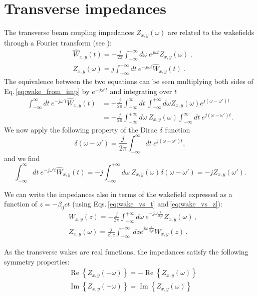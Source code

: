 \section{Transverse impedances}
The transverse beam coupling impedances $Z_{x,y}(\omega)$ are related to the wakefields through a Fourier transform (see \cite[Eq. 1.216]{Mounet:Thesis}):
\begin{align}
    &\widehat{W}_{x,y}(t) = -\frac{j}{2\pi}\int_{-\infty}^{+\infty} d\omega \ e^{j\omega t} Z_{x,y}(\omega)~,\label{eq:wake_from_imp}\\
    &Z_{x,y}(\omega) = j\int_{-\infty}^{+\infty} dt \ e^{-j\omega t} \widehat{W}_{x,y}(t)~.\label{eq:imp_from_wake}
\end{align}
The equivalence between the two equations can be seen multiplying both sides of Eq.\,\ref{eq:wake_from_imp} by $e^{-j\omega' t}$ and integrating over $t$
\begin{align}
    \int_{-\infty}^{\infty}dt \ e^{-j\omega' t}\widehat{W}_{x,y}(t) &= -\frac{j}{2\pi}\int_{-\infty}^{\infty}dt \ \int_{-\infty}^{+\infty} d\omega Z_{x,y}(\omega)e^{j(\omega-\omega') t}\\
    &= -\frac{j}{2\pi} \int_{-\infty}^{+\infty} d\omega \ Z_{x,y}(\omega) \int_{-\infty}^{\infty}dt \ e^{j(\omega-\omega') t}.
\end{align}
We now apply the following property of the Dirac $\delta$ function
\begin{equation}
    \delta(\omega-\omega') =  \frac{j}{2\pi} \int_{-\infty}^{\infty} dt \ e^{j(\omega-\omega') t},
\end{equation}
and we find
\begin{equation}
    \int_{-\infty}^{\infty}dt \ e^{-j\omega' t}\widehat{W}_{x,y}(t) = -j \int_{-\infty}^{+\infty} d\omega \ Z_{x,y}(\omega) \delta(\omega-\omega') = -j Z_{x, y}(\omega').
\end{equation}

We can write the impedances also in terms of the wakefield expressed as a function of $z= -\beta_0 c t$ (using Eqs.\,\ref{eq:wake_vs_t} and\,\ref{eq:wake_vs_z}):
\begin{align}
    &W_{x,y}(z) = -\frac{j}{2\pi}\int_{-\infty}^{+\infty} d\omega \ e^{-j\omega \frac{z}{\beta_0 c}} Z_{x,y}(\omega)\, ,\\
    &Z_{x,y}(\omega) = \frac{j}{\beta_0 c} \int_{-\infty}^{+\infty} \ dz e^{j \omega \frac{z}{\beta_0 c}} W_{x,y}(z)\, .
\end{align}

As the transverse wakes are real functions, the impedances satisfy the following symmetry properties:
\begin{align}
&\operatorname{Re}\left\{ Z_{x,y}( - \omega) \right\}
=
-\operatorname{Re}\left\{ Z_{x,y}( \omega) \right\}\\
&\operatorname{Im}\left\{ Z_{x,y}( -\omega) \right\}
=
\operatorname{Im}\left\{ Z_{x,y}( \omega) \right\}
\end{align}

